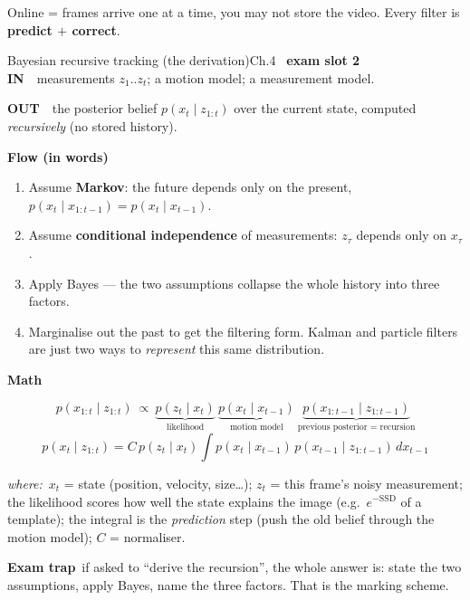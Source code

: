 \documentclass[9pt,a4paper]{extarticle}
\newcommand{\IN}{\textbf{\color{cIn}IN}\ }
\newcommand{\OUT}{\par\textbf{\color{cOut}OUT}\ }
\newcommand{\FLOW}{\par\smallskip\textbf{Flow (in words)}\par\nopagebreak}
\newcommand{\MATH}{\par\smallskip\textbf{Math}\par\nopagebreak}
\newcommand{\TRAP}{\par\smallskip\textbf{\color{cTrap}Exam trap}\ }
\newcommand{\WHERE}{\par\textit{where:}\ }
\begin{document}
Online = frames arrive one at a time, you may not store the video. Every filter is \textbf{predict $+$ correct}.

\begin{card}{Bayesian recursive tracking (the derivation)}{Ch.4 \textbullet\ \textbf{exam slot 2}}
\IN\ measurements $z_1..z_t$; a motion model; a measurement model.
\OUT\ the posterior belief $p(x_t\mid z_{1:t})$ over the current state, computed \emph{recursively} (no stored history).

\FLOW
\begin{enumerate}
  \item Assume \textbf{Markov}: the future depends only on the present, $p(x_t\mid x_{1:t-1})=p(x_t\mid x_{t-1})$.
  \item Assume \textbf{conditional independence} of measurements: $z_\tau$ depends only on $x_\tau$.
  \item Apply Bayes --- the two assumptions collapse the whole history into three factors.
  \item Marginalise out the past to get the filtering form. Kalman and particle filters are just two ways to \emph{represent} this same distribution.
\end{enumerate}

\MATH
\[ p(x_{1:t}\mid z_{1:t})\ \propto\ \underbrace{p(z_t\mid x_t)}_{\text{likelihood}}\ \underbrace{p(x_t\mid x_{t-1})}_{\text{motion model}}\ \underbrace{p(x_{1:t-1}\mid z_{1:t-1})}_{\text{previous posterior = recursion}} \]
\[ p(x_t\mid z_{1:t})=C\,p(z_t\mid x_t)\int p(x_t\mid x_{t-1})\,p(x_{t-1}\mid z_{1:t-1})\,dx_{t-1} \]
\WHERE $x_t$ = state (position, velocity, size\dots); $z_t$ = this frame's noisy measurement; the likelihood scores how well the state explains the image (e.g.\ $e^{-\mathrm{SSD}}$ of a template); the integral is the \emph{prediction} step (push the old belief through the motion model); $C$ = normaliser.

\TRAP if asked to ``derive the recursion'', the whole answer is: state the two assumptions, apply Bayes, name the three factors. That is the marking scheme.
\end{card}
\end{document}
